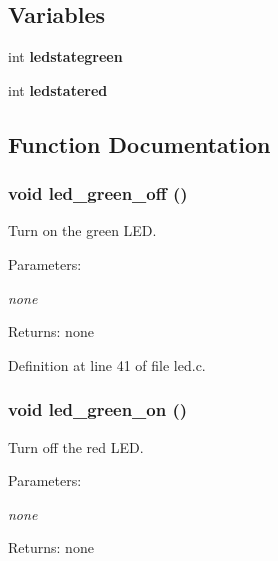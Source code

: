 \subsection*{Variables}
\begin{CompactItemize}
\item 
int {\bf ledstategreen}
\item 
int {\bf ledstatered}
\end{CompactItemize}


\subsection{Function Documentation}
\subsubsection{\setlength{\rightskip}{0pt plus 5cm}void led\_\-green\_\-off ()}\label{led_8h_9d8c7fecfd14584602c0c1ed091c469c}


Turn on the green LED. 

\begin{Desc}
\item[Parameters:]
\begin{description}
\item[{\em none}]\end{description}
\end{Desc}
\begin{Desc}
\item[Returns:]none \end{Desc}


Definition at line 41 of file led.c.
\subsubsection{\setlength{\rightskip}{0pt plus 5cm}void led\_\-green\_\-on ()}\label{led_8h_48bed5f60ae924d8e6cde6cb1135d419}


Turn off the red LED. 

\begin{Desc}
\item[Parameters:]
\begin{description}
\item[{\em none}]\end{description}
\end{Desc}
\begin{Desc}
\item[Returns:]none \end{Desc}


